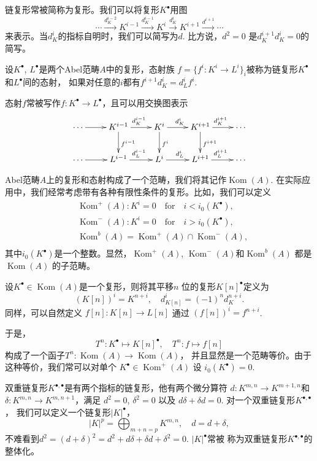 链复形常被简称为复形。我们可以将复形$K^\bullet$用图
\[
	\cdots  \xrightarrow{d_K^{i-2}} K^{i-1} \xrightarrow{d_K^{i-1}}K^i \xrightarrow{d_K^{i}}
	K^{i+1}\xrightarrow{d^{i+1}}\cdots
\]
来表示。当$d_K^{i}$的指标自明时，我们可以简写为$d$. 比方说，$d^2=0$
是$d_K^{i+1}d_K^i=0$的简写。

\begin{para}[链复形的态射]
	设$K^\bullet$, $L^\bullet$是两个Abel范畴$A$中的复形，态射族
    $f=\{f^i:K^i\to L^i\}_i$被称为链复形$K^\bullet$和$L^\bullet$间的态射，
    如果对任意的$i$都有$f^{i+1}d^i_K=d^i_Lf^i$.
\end{para}

态射$f$常被写作$f:K^\bullet\to L^\bullet$，且可以用交换图表示
\[
	\xymatrix{
		\cdots \ar[r]& K^{i-1}\ar[r]^{d^{i-1}_K}\ar[d]^{f^{i-1}}&K^i\ar[r]^{d^{i}_K}\ar[d]^{f^{i}}&K^{i+1}\ar[r]^{d^{i+1}_K}\ar[d]^{f^{i+1}}&\cdots\\
		\cdots \ar[r]& L^{i-1}\ar[r]^{d^{i-1}_L}&L^i\ar[r]^{d^{i}_L}&L^{i+1}\ar[r]^{d^{i+1}_L}&\cdots
	}
\]

Abel范畴$A$上的复形和态射构成了一个范畴，我们将其记作$\operatorname{Kom}(A)$.
在实际应用中，我们经常考虑带有各种有限性条件的复形。比如，我们可以定义
\[
\begin{aligned}
	&\operatorname{Kom}^+(A):K^i=0\quad \text{for}\quad i< i_0(K^\bullet),\\
	&\operatorname{Kom}^-(A):K^i=0\quad \text{for}\quad i> i_0(K^\bullet),\\
	&\operatorname{Kom}^b(A)=\operatorname{Kom}^+(A)\cap \operatorname{Kom}^-(A),\\
\end{aligned}
\]
其中$i_0(K^\bullet)$是一个整数。显然，$\operatorname{Kom}^+(A)$, 
$\operatorname{Kom}^-(A)$和$\operatorname{Kom}^b(A)$ 都是 
$\operatorname{Kom}(A)$ 的子范畴。

\begin{para}[平移]
	设$K^\bullet \in \operatorname{Kom}(A)$是一个复形，则将其平移$n$
    位的复形$K[n]^\bullet$定义为
	\[
		(K[n])^i=K^{n+i},\quad d_{K[n]}^i=(-1)^n d_K^{n+i}.
	\]
	同样，可以自然定义 $f[n]:K[n]\to L[n]$ 通过 
	$(f[n])^i=f^{n+i}$.
\end{para}

于是，
\[
	T^n:K^\bullet \mapsto K[n]^\bullet, \quad 
	T^n:f\mapsto f[n]
\]
构成了一个函子$T^n:\operatorname{Kom}(A)\to \operatorname{Kom}(A)$，
并且显然是一个范畴等价。由于这种等价，我们常可以对单个
$K^\bullet \in \operatorname{Kom}^+(A)$ 设 $i_0(K^\bullet)=0$.

\begin{para}[双重链复形]
双重链复形$K^{\bullet,\bullet}$是有两个指标的链复形，他有两个微分算符
$d:K^{m,n}\to K^{m+1,n}$和$\delta:K^{m,n}\to K^{m,n+1}$，满足
$d^2=0$, $\delta^2=0$ 以及 $d\delta+\delta d=0$. 对一个双重链复形$K^{\bullet,\bullet}$，
我们可以定义一个链复形$|K|^\bullet$，
\[
    |K|^p=\bigoplus_{m+n=p}K^{m,n},\quad d=d+\delta,
\]
不难看到$d^2=(d+\delta)^2=d^2+d\delta+\delta d+\delta^2=0$. $|K|^\bullet$常被
称为双重链复形$K^{\bullet,\bullet}$的整体化。
\end{para}

